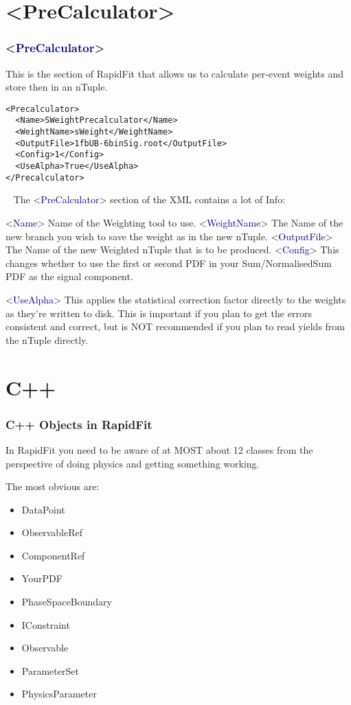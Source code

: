 \documentclass{beamer}
\begin{document}
\section{<PreCalculator>}
\begin{frame}[fragile]
\frametitle{<\textcolor{darkblue}{PreCalculator}>}
This is the section of RapidFit that allows us to calculate per-event weights and store then in an nTuple.
\tiny
\begin{lstlisting}[tabsize=8]
<Precalculator>
  <Name>SWeightPrecalculator</Name>
  <WeightName>sWeight</WeightName>
  <OutputFile>1fbUB-6binSig.root</OutputFile>
  <Config>1</Config>
  <UseAlpha>True</UseAlpha>
</Precalculator>
\end{lstlisting}\scriptsize~
The <\textcolor{darkblue}{PreCalculator}> section of the XML contains a lot of Info:

<\textcolor{darkblue}{Name}> Name of the Weighting tool to use.\newline
<\textcolor{darkblue}{WeightName}> The Name of the new branch you wish to save the weight as in the new nTuple.\newline
<\textcolor{darkblue}{OutputFile}> The Name of the new Weighted nTuple that is to be produced.\newline
<\textcolor{darkblue}{Config}> This changes whether to use the first or second PDF in your Sum/NormalisedSum PDF as the signal component.\newline

<\textcolor{darkblue}{UseAlpha}> This applies the statistical correction factor directly to the weights as they're written to disk.\newline
This is important if you plan to get the errors consistent and correct, but is NOT recommended if you plan to read yields from the nTuple directly.

\end{frame}

\section{C++}
\begin{frame}
\frametitle{C++ Objects in RapidFit}

In RapidFit you need to be aware of at MOST about 12 classes from the perspective of doing physics and getting something working.

The most obvious are:
\begin{itemize}
 \item DataPoint
 \item ObservableRef
 \item ComponentRef
 \item YourPDF
 \item PhaseSpaceBoundary
 \item IConstraint
 \item Observable
 \item ParameterSet
 \item PhysicsParameter
\end{itemize}

\end{frame}
\end{document}

